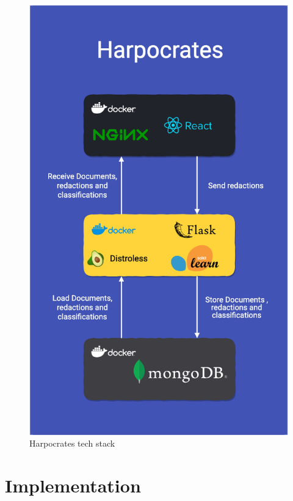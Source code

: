\documentclass{l4proj}
\begin{document}
\begin{figure}
    \includegraphics[width=\linewidth]{figures/tech_stack.png}
    \caption{Harpocrates tech stack}
    \label{fig:tech_stack}
\end{figure}

\chapter{Implementation}
\end{document}
